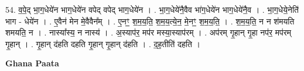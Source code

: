 \documentclass[17pt]{extarticle}
\begin{document}
54. व॒पे॒द् भा॒ग॒धेये॑न भाग॒धेये॑न वपेद् वपेद् भाग॒धेये॑न । . भा॒ग॒धेये॑नै॒वैव भा॑ग॒धेये॑न भाग॒धेये॑नै॒व । . भा॒ग॒धेये॒नेति॑ भाग - धेये॑न । . ए॒वैन॑ मेन मे॒वैवैन᳚म् । . ए॒नꣳ॒॒ श॒म॒य॒ति॒ श॒म॒य॒त्ये॒न॒ मे॒नꣳ॒॒ श॒म॒य॒ति॒ । . श॒म॒य॒ति॒ न न श॑मयति शमयति॒ न । . नास्या᳚स्य॒ न नास्य॑ । . अ॒स्याप॑र॒ मप॑र मस्या॒स्याप॑रम् । . अप॑रम् गृ॒हान् गृ॒हा नप॑र॒ मप॑रम् गृ॒हान् । . गृ॒हान् द॑हति दहति गृ॒हान् गृ॒हान् द॑हति । . द॒ह॒तीति॑ दहति । \newline

\textbf{Ghana Paata } \newline
\end{document}
